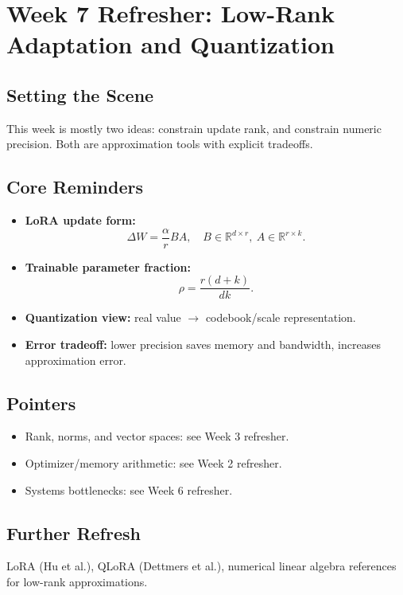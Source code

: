 \section{Week 7 Refresher: Low-Rank Adaptation and Quantization}

\subsection*{Setting the Scene}
This week is mostly two ideas: constrain update rank, and constrain numeric precision. Both are approximation tools with explicit tradeoffs.

\subsection*{Core Reminders}
\begin{itemize}[leftmargin=1.5em]
  \item \textbf{LoRA update form:}
  \[
    \Delta W = \frac{\alpha}{r}BA,\quad B\in\mathbb{R}^{d\times r},\ A\in\mathbb{R}^{r\times k}.
  \]
  \item \textbf{Trainable parameter fraction:}
  \[
    \rho=\frac{r(d+k)}{dk}.
  \]
  \item \textbf{Quantization view:} real value $\to$ codebook/scale representation.
  \item \textbf{Error tradeoff:} lower precision saves memory and bandwidth, increases approximation error.
\end{itemize}

\subsection*{Pointers}
\begin{itemize}[leftmargin=1.5em]
  \item Rank, norms, and vector spaces: see Week 3 refresher.
  \item Optimizer/memory arithmetic: see Week 2 refresher.
  \item Systems bottlenecks: see Week 6 refresher.
\end{itemize}

\subsection*{Further Refresh}
LoRA (Hu et al.), QLoRA (Dettmers et al.), numerical linear algebra references for low-rank approximations.
